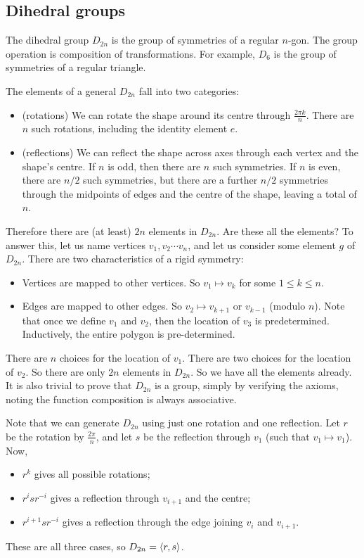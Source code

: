 \subsection{Dihedral groups}
\begin{definition}
	The dihedral group \(D_{2n}\) is the group of symmetries of a regular \(n\)-gon.
	The group operation is composition of transformations.
	For example, \(D_6\) is the group of symmetries of a regular triangle.
\end{definition}
The elements of a general \(D_{2n}\) fall into two categories:
\begin{itemize}
	\item (rotations) We can rotate the shape around its centre through \(\frac{2\pi k}{n}\).
	      There are \(n\) such rotations, including the identity element \(e\).
	\item (reflections) We can reflect the shape across axes through each vertex and the shape's centre.
	      If \(n\) is odd, then there are \(n\) such symmetries.
	      If \(n\) is even, there are \(n/2\) such symmetries, but there are a further \(n/2\) symmetries through the midpoints of edges and the centre of the shape, leaving a total of \(n\).
\end{itemize}
Therefore there are (at least) \(2n\) elements in \(D_{2n}\).
Are these all the elements?
To answer this, let us name vertices \(v_1, v_2 \cdots v_n\), and let us consider some element \(g\) of \(D_{2n}\).
There are two characteristics of a rigid symmetry:
\begin{itemize}
	\item Vertices are mapped to other vertices.
	      So \(v_1 \mapsto v_k\) for some \(1 \leq k \leq n\).
	\item Edges are mapped to other edges.
	      So \(v_2 \mapsto v_{k+1}\) or \(v_{k-1}\) (modulo \(n\)).
	      Note that once we define \(v_1\) and \(v_2\), then the location of \(v_3\) is predetermined.
	      Inductively, the entire polygon is pre-determined.
\end{itemize}
There are \(n\) choices for the location of \(v_1\).
There are two choices for the location of \(v_2\).
So there are only \(2n\) elements in \(D_{2n}\).
So we have all the elements already.
It is also trivial to prove that \(D_{2n}\) is a group, simply by verifying the axioms, noting the function composition is always associative.

Note that we can generate \(D_{2n}\) using just one rotation and one reflection.
Let \(r\) be the rotation by \(\frac{2\pi}{n}\), and let \(s\) be the reflection through \(v_1\) (such that \(v_1 \mapsto v_1\)).
Now,
\begin{itemize}
	\item \(r^k\) gives all possible rotations;
	\item \(r^i s r^{-i}\) gives a reflection through \(v_{i+1}\) and the centre;
	\item \(r^{i+1} s r^{-i}\) gives a reflection through the edge joining \(v_{i}\) and \(v_{i+1}\).
\end{itemize}
These are all three cases, so \(D_{2n} = \left\langle{} r, s \right\rangle\).
